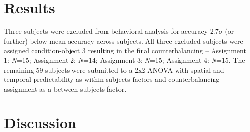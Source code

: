 \documentclass[dwyatte_dissertation.tex]{subfiles}
\begin{document}
\section{Results}
Three subjects were excluded from behavioral analysis for accuracy 2.7$\sigma$ (or further) below mean accuracy across subjects. All three excluded subjects were assigned condition-object 3 resulting in the final counterbalancing -- Assignment 1: \textit{N}=15; Assignment 2: \textit{N}=14; Assignment 3: \textit{N}=15; Assignment 4: \textit{N}=15. The remaining 59 subjects were submitted to a 2x2 ANOVA with spatial and temporal predictability as within-subjects factors and counterbalancing assignment as a between-subjects factor. %

\section{Discussion}



\end{document}
